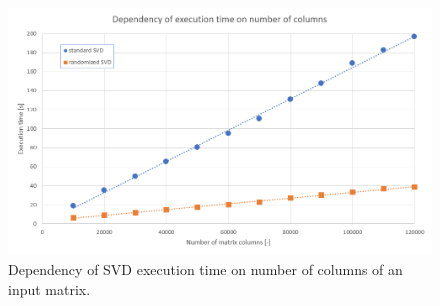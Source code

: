 \begin{figure}[H]
\centering\includegraphics[width=\textwidth]{figures/executionTime_varyingColumns}
\caption{Dependency of SVD execution time on number of columns of an input matrix.}
\label{fig:ExeTime_columns}
\end{figure}
